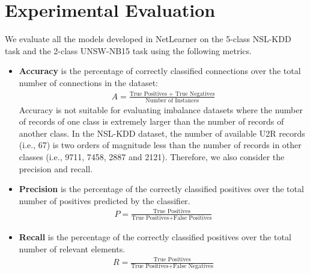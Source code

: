 \section{Experimental Evaluation}

We evaluate all the models developed in NetLearner on the 5-class NSL-KDD task and the 2-class UNSW-NB15 task using the following metrics.
\begin{itemize}
    \item \textbf{Accuracy} is the percentage of correctly classified connections
        over the total number of connections in the dataset:
        \begin{align}
            A = \frac{\text{True Positives + True Negatives}}{\text{Number of Instances}}
        \end{align} 
        Accuracy is not suitable for evaluating imbalance datasets where the number
        of records of one class is extremely larger than the number of
        records of another class.
        In the NSL-KDD dataset, the number of available U2R records (i.e., 67)
        is two orders of magnitude less than the number of records in other classes
        (i.e., 9711, 7458, 2887 and 2121).
        Therefore, we also consider the precision and recall.
    \item \textbf{Precision} is the percentage of the correctly classified positives over
        the total number of positives predicted by the classifier.
                \begin{align}
                    P = \frac{\text{True Positives}}{\text{True Positives} + \text{False Positives}}
                \end{align}
    \item \textbf{Recall} is the percentage of the correctly classified positives over
                the total number of relevant elements.
                \begin{align}
                    R = \frac{\text{True Positives}}{\text{True Positives} + \text{False Negatives}}
                \end{align}
\end{itemize}

